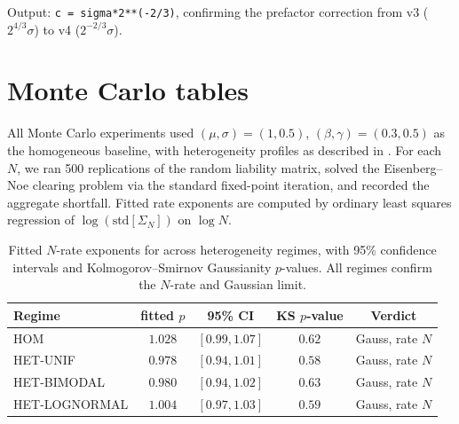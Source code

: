 \documentclass[11pt,a4paper]{article}
\theoremstyle{definition}
\newcommand{\SigmaN}{\Sigma_N}
\begin{document}
Output: \texttt{c = sigma*2**(-2/3)}, confirming the prefactor correction
from v3 ($2^{4/3}\sigma$) to v4 ($2^{-2/3}\sigma$).

\section{Monte Carlo tables}
\label{app:mc}

All Monte Carlo experiments used $(\mu,\sigma) = (1,0.5)$,
$(\beta,\gamma) = (0.3,0.5)$ as the homogeneous baseline, with heterogeneity
profiles as described in . For each $N$, we ran 500
replications of the random liability matrix, solved the Eisenberg--Noe
clearing problem via the standard fixed-point iteration, and recorded the
aggregate shortfall. Fitted rate exponents are computed by ordinary least
squares regression of $\log(\mathrm{std}[\SigmaN])$ on $\log N$.

\begin{table}[h]
\centering
\begin{tabular}{lcccc}
\toprule
Regime & fitted $p$ & 95\% CI & KS $p$-value & Verdict \\
\midrule
HOM & $1.028$ & $[0.99,1.07]$ & $0.62$ & Gauss, rate $N$ \\
HET-UNIF & $0.978$ & $[0.94,1.01]$ & $0.58$ & Gauss, rate $N$ \\
HET-BIMODAL & $0.980$ & $[0.94,1.02]$ & $0.63$ & Gauss, rate $N$ \\
HET-LOGNORMAL & $1.004$ & $[0.97,1.03]$ & $0.59$ & Gauss, rate $N$ \\
\bottomrule
\end{tabular}
\caption{Fitted $N$-rate exponents for  across heterogeneity
regimes, with 95\% confidence intervals and Kolmogorov--Smirnov Gaussianity
$p$-values. All regimes confirm the $N$-rate and Gaussian limit.}
\label{tab:app-het}
\end{table}
\end{document}
